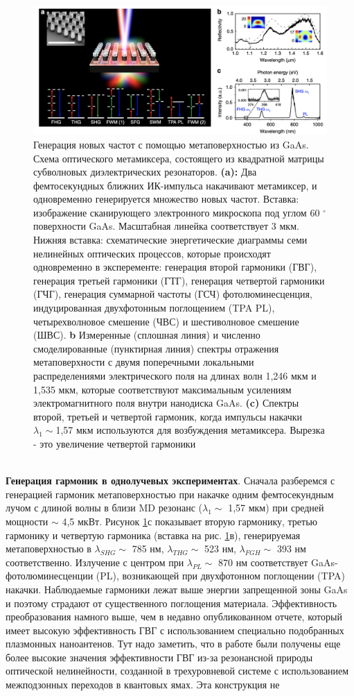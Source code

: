 \begin{figure}[h!]
	\centering
	\includegraphics[width=0.7\linewidth]{images/mixer.png}
	\caption{Генерация новых частот с помощью метаповерхностью из  GaAs. Схема оптического метамиксера, состоящего из квадратной матрицы субволновых диэлектрических резонаторов. \textbf{(a):} Два фемтосекундных ближних ИК-импульса накачивают метамиксер, и одновременно генерируется множество новых частот. Вставка: изображение сканирующего электронного микроскопа под углом 60 $^\circ$ поверхности GaAs. Масштабная линейка соответствует 3 мкм. Нижняя вставка: схематические энергетические диаграммы семи нелинейных оптических процессов, которые происходят одновременно в эксперементе: генерация второй гармоники (ГВГ), генерация третьей гармоники (ГТГ), генерация четвертой гармоники (ГЧГ), генерация суммарной частоты (ГСЧ) фотолюминесценция, индуцированная двухфотонным поглощением (TPA PL), четырехволновое смешение (ЧВС) и шестиволновое смешение (ШВС). \textbf{b} Измеренные (сплошная линия) и численно смоделированные (пунктирная линия) спектры отражения метаповерхности с двумя поперечными локальными распределениями электрического поля на длинах волн 1,246 мкм и 1,535 мкм, которые соответствуют максимальным усилениям электромагнитного поля внутри нанодиска GaAs. \textbf{(c)} Спектры второй, третьей и четвертой гармоник, когда импульсы накачки $\lambda_1 \sim $1,57 мкм используются для возбуждения метамиксера. Вырезка - это увеличение четвертой гармоники}
	\label{mixerPictr1}
\end{figure}
\\
\hspace*{2mm}
\textbf{Генерация гармоник в однолучевых экспериментах}. Сначала разберемся с генерацией гармоник метаповерхностью при накачке одним фемтосекундным лучом с длиной волны в близи MD резонанс ($\lambda_1 \sim$ 1,57 мкм) при средней мощности $\sim$ 4,5 мкВт. Рисунок \ref{mixerPictr1}с показывает вторую гармонику, третью гармонику и четвертую гармоника (вставка на рис. \ref{mixerPictr1}в), генерируемая метаповерхностью в $\lambda_{SHG} \sim$ 785 нм, $\lambda_{THG} \sim$ 523 нм, $\lambda_{FGH} \sim$ 393 нм соответственно. Излучение с центром при $\lambda_{PL} \sim$ 870 нм соответствует GaAs-фотолюминесценции (PL), возникающей при двухфотонном поглощении (TPA) накачки. Наблюдаемые гармоники лежат выше энергии запрещенной зоны GaAs и поэтому страдают от существенного поглощения материала. Эффективность преобразования намного выше, чем в недавно опубликованном отчете, который имеет высокую эффективность ГВГ с использованием специально подобранных плазмонных наноантенов. Тут надо заметить, что в работе \cite{wolf2015phased} были получены еще более высокие значения эффективности ГВГ из-за резонансной природы оптической нелинейности, созданной в трехуровневой системе с использованием межподзонных переходов в квантовых ямах. Эта конструкция не 
